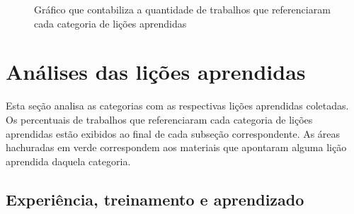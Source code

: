 \begin{figure}[H]
	\centering
	\captionsetup{justification=centering,margin=2cm}
	\caption{Gráfico que contabiliza a quantidade de trabalhos que referenciaram cada categoria de lições aprendidas}
	\label{fig:categorias}
\end{figure}

\section{Análises das lições aprendidas}

Esta seção analisa as categorias com as respectivas lições aprendidas coletadas. Os percentuais de trabalhos que referenciaram cada categoria de lições aprendidas estão exibidos ao final de cada subseção correspondente. As áreas hachuradas em verde correspondem aos materiais que apontaram alguma lição aprendida daquela categoria.

\subsection{Experiência, treinamento e aprendizado}

